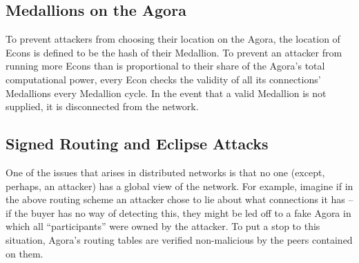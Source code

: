 \documentclass{article}
\begin{document}
\subsection{Medallions on the Agora}

To prevent attackers from choosing their location on the Agora, the
location of Econs is defined to be the hash of their Medallion.  To
prevent an attacker from running more Econs than is proportional to
their share of the Agora's total computational power, every Econ
checks the validity of all its connections' Medallions every Medallion
cycle. In the event that a valid Medallion is not supplied, it is
disconnected from the network.

\subsection{Signed Routing and Eclipse Attacks}










One of the issues that arises in distributed networks is that no one (except, perhaps, an attacker) has a global view of the network. For example, imagine if in the above routing scheme an attacker chose to lie about what connections it has – if the buyer has no way of detecting this, they might be led off to a fake Agora in which all “participants” were owned by the attacker. To put a stop to this situation, Agora's routing tables are verified non-malicious by the peers contained on them.
\end{document}
